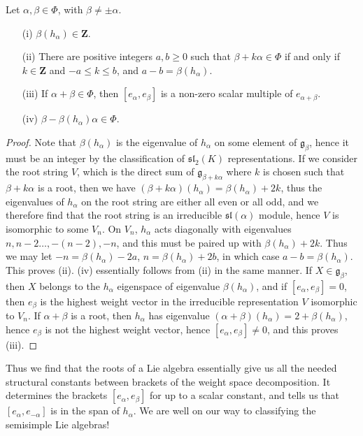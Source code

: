 \begin{theorem}
    Let $\alpha, \beta \in \Phi$, with $\beta \neq \pm \alpha$.
    \begin{enumerate}
        \item[(i)] $\beta(h_\alpha) \in \mathbf{Z}$.
        \item[(ii)] There are positive integers $a,b \geq 0$ such that $\beta + k\alpha \in \Phi$ if and only if $k \in \mathbf{Z}$ and $-a \leq k \leq b$, and $a - b = \beta(h_\alpha)$.
        \item[(iii)] If $\alpha + \beta \in \Phi$, then $[e_\alpha, e_\beta]$ is a non-zero scalar multiple of $e_{\alpha + \beta}$.
        \item[(iv)] $\beta - \beta(h_\alpha)\alpha \in \Phi$.
    \end{enumerate}
\end{theorem}
\begin{proof}
    Note that $\beta(h_\alpha)$ is the eigenvalue of $h_\alpha$ on some element of $\mathfrak{g}_\beta$, hence it must be an integer by the classification of $\mathfrak{sl}_2(K)$ representations. If we consider the root string $V$, which is the direct sum of $\mathfrak{g}_{\beta + k \alpha}$ where $k$ is chosen such that $\beta + k \alpha$ is a root, then we have $(\beta + k \alpha)(h_\alpha) = \beta(h_\alpha) + 2k$, thus the eigenvalues of $h_\alpha$ on the root string are either all even or all odd, and we therefore find that the root string is an irreducible $\mathfrak{sl}(\alpha)$ module, hence $V$ is isomorphic to some $V_n$. On $V_n$, $h_\alpha$ acts diagonally with eigenvalues $n,n-2\dots,-(n-2),-n$, and this must be paired up with $\beta(h_\alpha) + 2k$. Thus we may let $-n = \beta(h_\alpha) - 2a$, $n = \beta(h_\alpha) + 2b$, in which case $a - b = \beta(h_\alpha)$. This proves (ii). (iv) essentially follows from (ii) in the same manner. If $X \in \mathfrak{g}_\beta$, then $X$ belongs to the $h_\alpha$ eigenspace of eigenvalue $\beta(h_\alpha)$, and if $[e_\alpha, e_\beta] = 0$, then $e_\beta$ is the highest weight vector in the irreducible representation $V$ isomorphic to $V_n$. If $\alpha + \beta$ is a root, then $h_\alpha$ has eigenvalue $(\alpha + \beta)(h_\alpha) = 2 + \beta(h_\alpha)$, hence $e_\beta$ is not the highest weight vector, hence $[e_\alpha, e_\beta] \neq 0$, and this proves (iii).
\end{proof}

Thus we find that the roots of a Lie algebra essentially give us all the needed structural constants between brackets of the weight space decomposition. It determines the brackets $[e_\alpha, e_\beta]$ for up to a scalar constant, and tells us that $[e_\alpha, e_{-\alpha}]$ is in the span of $h_\alpha$. We are well on our way to classifying the semisimple Lie algebras!




